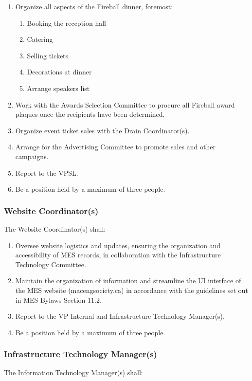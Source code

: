 \begin{enumerate}
 \item
  Organize all aspects of the Fireball dinner, foremost:

  \begin{enumerate}
   \item
    Booking the reception hall
   \item
    Catering
   \item
    Selling tickets
   \item
    Decorations at dinner
   \item
    Arrange speakers list
  \end{enumerate}
 \item
  Work with the Awards Selection Committee to procure all Fireball award plaques once the recipients have been determined.
 \item
  Organize event ticket sales with the Drain Coordinator(s).
 \item
  Arrange for the Advertising Committee to promote sales and other campaigns.
 \item
  Report to the VPSL.
 \item
  Be a position held by a maximum of three people.

\end{enumerate}

\subsubsection{Website Coordinator(s)} 
\label{website-coordinators} 
The Website Coordinator(s) shall: 

\begin{enumerate} 
  \item  
   Oversee website logistics and updates, ensuring the organization and accessibility of MES records, in collaboration with the Infrastructure Technology Committee. 
  \item    
   Maintain the organization of information and streamline the UI interface of the MES website (macengsociety.ca) in accordance with the guidelines set out in MES Bylaws Section 11.2. 
  \item    
   Report to the VP Internal and Infrastructure Technology Manager(s). 
  \item    
   Be a position held by a maximum of three people. 
\end{enumerate}

\subsubsection{Infrastructure Technology Manager(s)}
\label{infrastructure-technology-managers}
The Information Technology Manager(s) shall:

